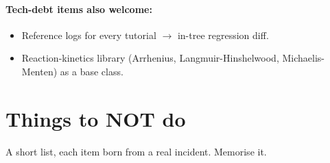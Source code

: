 \documentclass[11pt,a4paper]{article}
\begin{document}
\paragraph{Tech-debt items also welcome:}
\begin{itemize}[leftmargin=*,nosep]
  \item Reference logs for every tutorial $\to$ in-tree regression diff.
  \item Reaction-kinetics library (Arrhenius, Langmuir-Hinshelwood,
        Michaelis-Menten) as a  base class.
\end{itemize}

\section{Things to NOT do}\label{sec:donts}

\begin{whatyoulllearn}
A short list, each item born from a real incident. Memorise it.
\end{whatyoulllearn}
\end{document}
